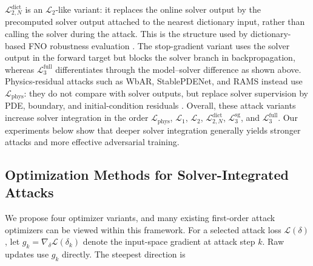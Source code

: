 \documentclass{article}
\begin{document}
$\mathcal{L}_{2,N}^{\mathrm{dict}}$ is an $\mathcal{L}_2$-like variant: it
replaces the online solver output by the precomputed solver output attached to
the nearest dictionary input, rather than calling the solver during the attack.
This is the structure used by dictionary-based FNO robustness evaluation
\citep{adesoji2022evaluating}. The stop-gradient variant uses the solver output
in the forward target but blocks the solver branch in backpropagation, whereas
$\mathcal{L}_3^{\mathrm{full}}$ differentiates through the model--solver
difference as shown above. Physics-residual attacks such as WbAR, StablePDENet,
and RAMS instead use $\mathcal{L}_{\mathrm{phys}}$: they do not compare with
solver outputs, but replace solver supervision by PDE, boundary, and
initial-condition residuals
\citep{shi2025wbar,huang2026stablepdenet,ouyang2025rams}.
Overall, these attack variants increase solver integration in the order
$\mathcal{L}_{\mathrm{phys}}$, $\mathcal{L}_1$, $\mathcal{L}_2$,
$\mathcal{L}_{2,N}^{\mathrm{dict}}$, $\mathcal{L}_3^{\mathrm{sg}}$, and
$\mathcal{L}_3^{\mathrm{full}}$.
Our experiments below show that deeper solver integration generally yields
stronger attacks and more effective adversarial training.

\subsection{Optimization Methods for Solver-Integrated Attacks}

We propose four optimizer variants, and many existing first-order attack
optimizers can be viewed within this framework. For a selected attack loss
$\mathcal{L}(\delta)$, let
$g_k=\nabla_\delta\mathcal{L}(\delta_k)$ denote the input-space gradient at
attack step $k$. Raw updates use $g_k$ directly. The steepest direction is

{\renewcommand{\arraystretch}{1.15}
\noindent{}\par}
\end{document}
